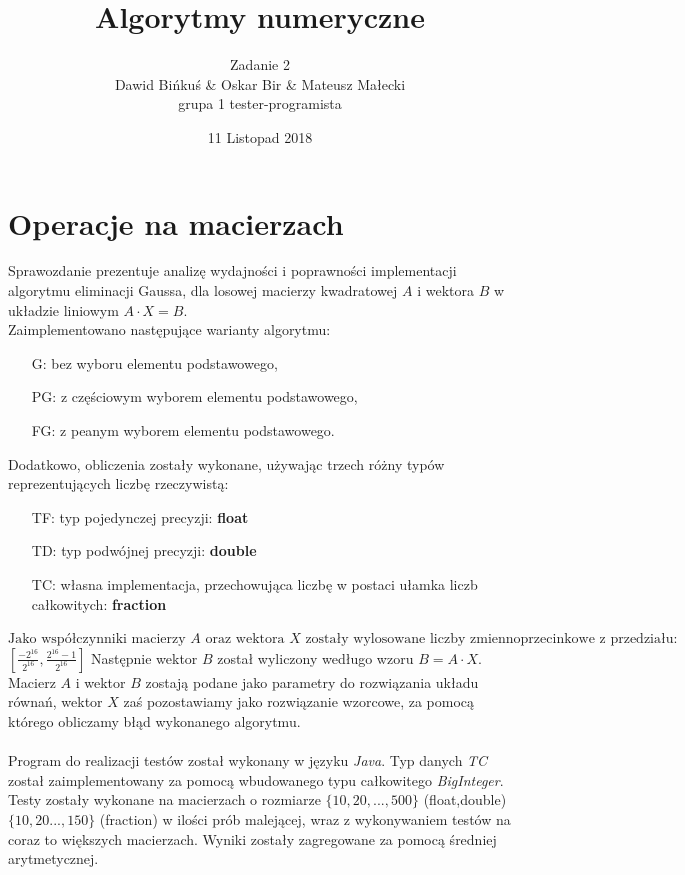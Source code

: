 \documentclass[10pt]{article}
\title{Algorytmy numeryczne}
\author{Zadanie 2 \\ Dawid Bińkuś \& Oskar Bir \& Mateusz Małecki\\grupa 1 tester-programista}
\date{11 Listopad 2018}
\begin{document}
\maketitle 

\section{Operacje na macierzach}
Sprawozdanie prezentuje analizę wydajności i poprawności implementacji algorytmu eliminacji Gaussa, dla losowej macierzy kwadratowej $A$ i wektora $B$ w układzie liniowym
$A\cdot X = B.$\\
Zaimplementowano następujące warianty algorytmu:
\begin{itemize}
	\item[G:]bez wyboru elementu podstawowego,
	\item [PG:]z częściowym wyborem elementu podstawowego,
	\item [FG:]z peanym wyborem elementu podstawowego.
\end{itemize}
Dodatkowo, obliczenia zostały wykonane, używając trzech różny typów reprezentujących liczbę rzeczywistą:
\begin{itemize}
	\item[TF:]typ pojedynczej precyzji: \textbf{float}
	\item[TD:]typ podwójnej precyzji: \textbf{double}
	\item[TC:]własna implementacja, przechowująca liczbę w postaci ułamka liczb całkowitych: \textbf{fraction}
\end{itemize}
$\text{Jako współczynniki macierzy } A \text{ oraz wektora } X \text{ zostały wylosowane liczby zmiennoprzecinkowe z przedziału: }$\\
$[\frac{-2^{16}}{2^{16}},\frac{2^{16}-1}{2^{16}}]$ Następnie wektor $B$ został wyliczony wedługo wzoru $B = A\cdot X$.
Macierz $A$ i wektor $B$ zostają podane jako parametry do rozwiązania układu równań, wektor $X$ zaś pozostawiamy jako rozwiązanie wzorcowe, za pomocą którego obliczamy błąd wykonanego algorytmu.\\\\
Program do realizacji testów został wykonany w języku \textit{Java}. Typ danych \textit{TC} został zaimplementowany za pomocą wbudowanego typu całkowitego \emph{BigInteger}. Testy zostały wykonane na macierzach o rozmiarze $\{10,20,...,500\}$ (float,double) $\{10,20...,150\}$ (fraction) 
w ilości prób malejącej, wraz z wykonywaniem testów na coraz to większych macierzach. Wyniki zostały zagregowane za pomocą średniej arytmetycznej.
\end{document}
